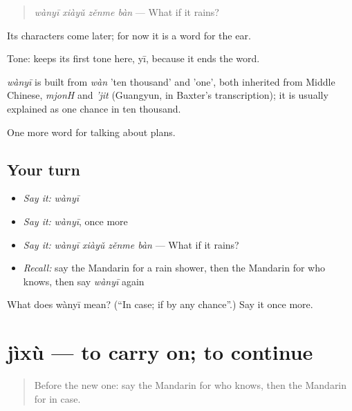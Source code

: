 \begin{quote}
\emph{wànyī xiàyǔ zěnme bàn} — What if it rains?
\end{quote}

Its characters come later; for now it is a word for the ear.

Tone:  keeps its first tone here, yī, because it ends the word.

\begin{cousinweb}
\emph{wànyī} is built from \emph{wàn} 'ten thousand' and  'one', both inherited from Middle Chinese, \emph{mjonH} and \emph{'jit} (Guangyun, in Baxter's transcription); it is usually explained as one chance in ten thousand.
\end{cousinweb}

\begin{grammarlens}[title={What you've built}]
One more word for talking about plans.
\end{grammarlens}

\subsection*{Your turn}
\begin{itemize}
\raggedright
  \item \emph{Say it:} \emph{wànyī}
  \item \emph{Say it:} \emph{wànyī}, once more
  \item \emph{Say it:} \emph{wànyī xiàyǔ zěnme bàn} — What if it rains?
  \item \emph{Recall:} say the Mandarin for a rain shower, then the Mandarin for who knows, then say \emph{wànyī} again
\end{itemize}

\begin{tcolorbox}[breakable,colback=teal!4,colframe=teal!35!black,title={Before you move on}]
What does wànyī mean? (\textquotedblleft{}In case; if by any chance\textquotedblright{}.) Say it once more.
\end{tcolorbox}
\section[jìxù]{jìxù — to carry on; to continue}

\label{lesson:ZH-C244-jixu}



\begin{quote}
Before the new one: say the Mandarin for who knows, then the Mandarin for in case.
\end{quote}


